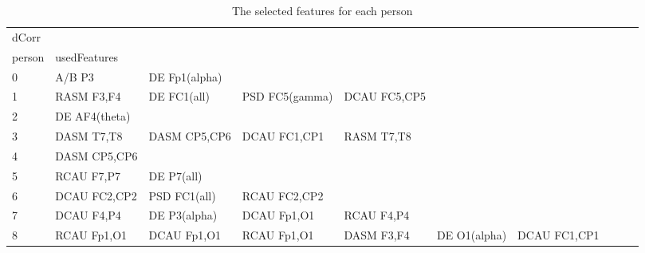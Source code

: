\begin{landscape}
\begin{table}[]
\centering
\caption{The selected features for each person}
\begin{tabular}{l|llllllll}
dCorr    &                &                &                &                &                &                &                &                &               &              \\
person   & usedFeatures   &                &                &                &                &                &                &                &               &              \\
0        & A/B P3         & DE Fp1(alpha)  &                &                &                &                &                &                &               &              \\
1        & RASM F3,F4     & DE FC1(all)    & PSD FC5(gamma) & DCAU FC5,CP5   &                &                &                &                &               &              \\
2        & DE AF4(theta)  &                &                &                &                &                &                &                &               &              \\
3        & DASM T7,T8     & DASM CP5,CP6   & DCAU FC1,CP1   & RASM T7,T8     &                &                &                &                &               &              \\
4        & DASM CP5,CP6   &                &                &                &                &                &                &                &               &              \\
5        & RCAU F7,P7     & DE P7(all)     &                &                &                &                &                &                &               &              \\
6        & DCAU FC2,CP2   & PSD FC1(all)   & RCAU FC2,CP2   &                &                &                &                &                &               &              \\
7        & DCAU F4,P4     & DE P3(alpha)   & DCAU Fp1,O1    & RCAU F4,P4     &                &                &                &                &               &              \\
8        & RCAU Fp1,O1    & DCAU Fp1,O1    & RCAU Fp1,O1    & DASM F3,F4     & DE O1(alpha)   & DCAU FC1,CP1   &                &                &               &              \\

\end{tabular}
\end{table}
\end{landscape}
